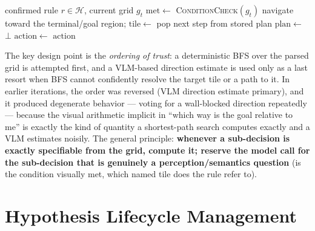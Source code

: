 \documentclass{article}
\newcommand{\Hyp}{\mathcal{H}}
\begin{document}
\begin{algorithm}
\caption{Strategic action check (chain decomposition)}
\label{alg:chain}
\begin{algorithmic}[1]
\Require confirmed rule $r \in \Hyp$, current grid $g_t$
\State $\mathrm{met} \gets$ \textsc{ConditionCheck}$(g_t)$ 
  \State navigate toward the terminal/goal region; \Return
\EndIf
\State $\mathrm{tile} \gets$  
  \State pop next step from stored plan
\Else
  \State $\mathrm{plan} \gets$  
    \State \Return $\bot$ 
  \EndIf
\EndIf
\State $\mathrm{action} \gets$  
\State \Return $\mathrm{action}$
\end{algorithmic}
\end{algorithm}

The key design point is the \emph{ordering of trust}: a deterministic
BFS over the parsed grid is attempted first, and a VLM-based direction
estimate is used only as a last resort when BFS cannot confidently
resolve the target tile or a path to it. In earlier iterations, the
order was reversed (VLM direction estimate primary), and it produced
degenerate behavior — voting for a wall-blocked direction repeatedly —
because the visual arithmetic implicit in ``which way is the goal
relative to me'' is exactly the kind of quantity a shortest-path search
computes exactly and a VLM estimates noisily. The general principle:
\textbf{whenever a sub-decision is exactly specifiable from the grid,
compute it; reserve the model call for the sub-decision that is
genuinely a perception/semantics question} (is the condition visually
met, which named tile does the rule refer to).

\section{Hypothesis Lifecycle Management}
\label{sec:lifecycle}
\end{document}
